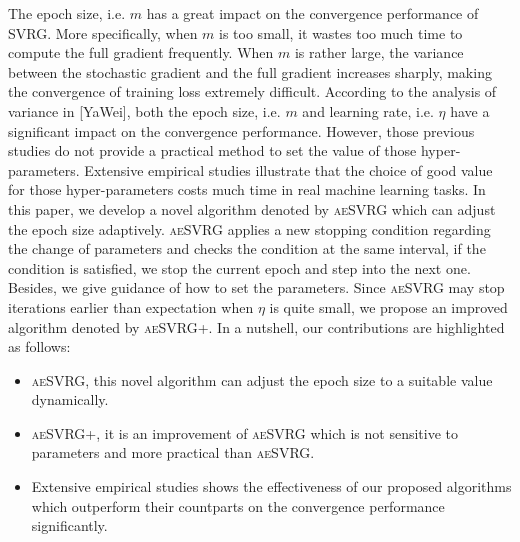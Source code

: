 \documentclass[conference]{IEEEtran}
\begin{document}
The epoch size, i.e. $m$ has a great impact on the convergence performance of SVRG. More specifically, when $m$ is too small, it wastes too much time to compute the full gradient frequently. When $m$ is rather large, the variance between the stochastic gradient and the full gradient increases sharply, making the convergence of training loss extremely difficult. According to the analysis of variance in [YaWei], both the epoch size, i.e. $m$ and learning rate, i.e. $\eta$ have a significant impact on the convergence performance.  However, those previous studies do not provide a practical method to set the value of those hyper-parameters. Extensive empirical studies illustrate that the choice of good value for those hyper-parameters costs much time in real machine learning tasks.  
In this paper, we develop a novel algorithm denoted by \textsc{aeSVRG} which can adjust the epoch size adaptively.  
\textsc{aeSVRG} applies a new stopping condition regarding the change of parameters and checks the condition at the same interval, if the condition is satisfied, we stop the current epoch and step into the next one.
Besides, we give guidance of how to set the parameters. Since \textsc{aeSVRG} may stop iterations earlier than expectation when $\eta$ is quite small, we propose an improved algorithm denoted by \textsc{aeSVRG+}. In a nutshell, our contributions are highlighted as follows:
\begin {itemize}
\item \textsc{aeSVRG}, this novel algorithm can adjust the epoch size to a suitable value dynamically.
\item \textsc{aeSVRG+}, it is an improvement of \textsc{aeSVRG} which is not sensitive to parameters and more practical than \textsc{aeSVRG}.
\item Extensive empirical studies shows the effectiveness of our proposed algorithms which outperform their countparts on the convergence performance significantly.
\end {itemize}
\end{document}
